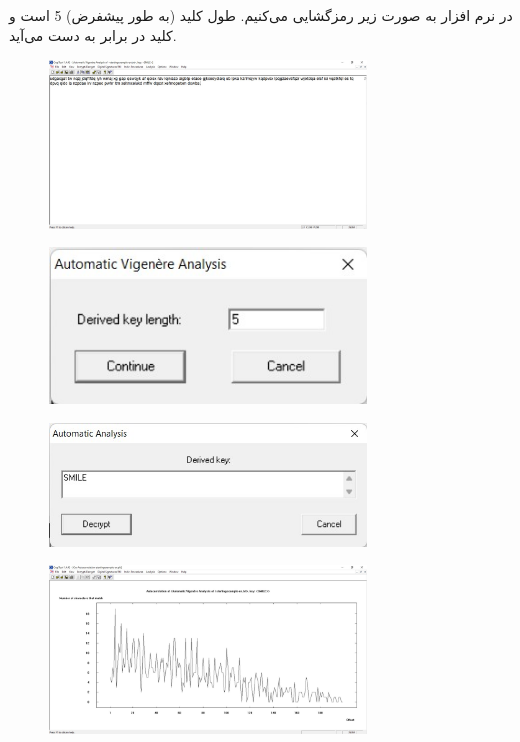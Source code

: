 \documentclass{article}
\begin{document}
\subsection{}%
در نرم افزار  به صورت زیر رمزگشایی می‌کنیم. طول کلید (به طور پیشفرض) 5 است و کلید در  برابر  به دست می‌آید.
\begin{figure}[H]
    \centering
    \includegraphics[width=0.75\textwidth]{figures/4a.jpg}
    \caption
	{}
    \label{fig:fig1}
\end{figure}

\begin{figure}[H]
    \centering
    \includegraphics[width=0.75\textwidth]{figures/4b.jpg}
    \caption
	{}
    \label{fig:fig1}
\end{figure}

\begin{figure}[H]
    \centering
    \includegraphics[width=0.75\textwidth]{figures/4c.jpg}
    \caption
	{}
    \label{fig:fig1}
\end{figure}

\begin{figure}[H]
    \centering
    \includegraphics[width=0.75\textwidth]{figures/4d.jpg}
    \caption
	{}
    \label{fig:fig1}
\end{figure}
\end{document}

